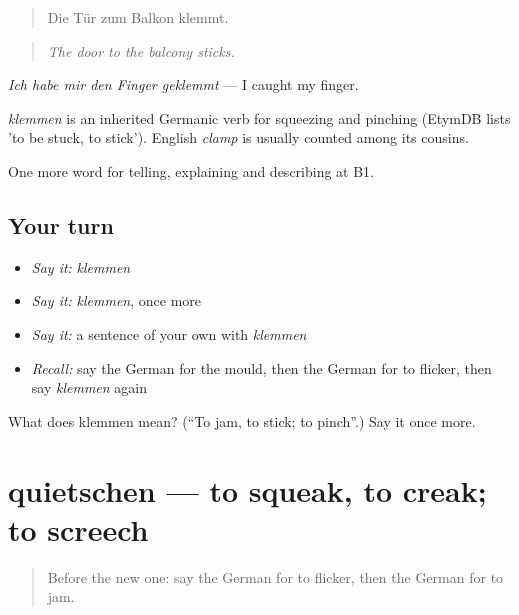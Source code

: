\begin{quote}
Die Tür zum Balkon klemmt.
\end{quote}

\begin{quote}
\emph{The door to the balcony sticks.}
\end{quote}

\emph{Ich habe mir den Finger geklemmt} — I caught my finger.

\begin{cousinweb}
\emph{klemmen} is an inherited Germanic verb for squeezing and pinching (EtymDB lists 'to be stuck, to stick'). English \emph{clamp} is usually counted among its cousins.
\end{cousinweb}

\begin{grammarlens}[title={What you've built}]
One more word for telling, explaining and describing at B1.
\end{grammarlens}

\subsection*{Your turn}
\begin{itemize}
\raggedright
  \item \emph{Say it:} \emph{klemmen}
  \item \emph{Say it:} \emph{klemmen}, once more
  \item \emph{Say it:} a sentence of your own with \emph{klemmen}
  \item \emph{Recall:} say the German for the mould, then the German for to flicker, then say \emph{klemmen} again
\end{itemize}

\begin{tcolorbox}[breakable,colback=teal!4,colframe=teal!35!black,title={Before you move on}]
What does klemmen mean? (\textquotedblleft{}To jam, to stick; to pinch\textquotedblright{}.) Say it once more.
\end{tcolorbox}
\section[quietschen]{quietschen — to squeak, to creak; to screech}

\label{lesson:GE-C429-quietschen}



\begin{quote}
Before the new one: say the German for to flicker, then the German for to jam.
\end{quote}


